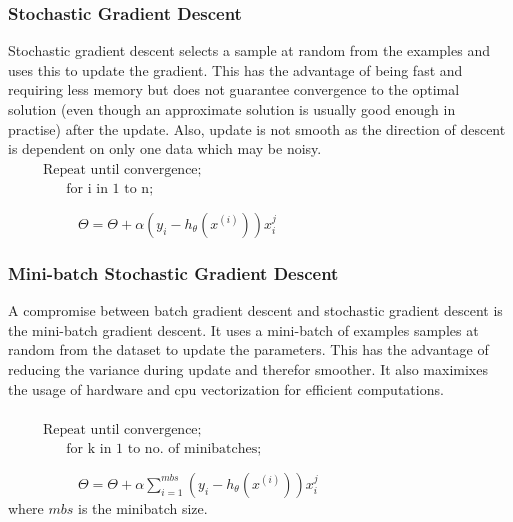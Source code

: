 \documentclass[12pt,a4paper,titlepage,portrait,openany]{book}
\begin{document}
	\subsubsection{Stochastic Gradient Descent}
	Stochastic gradient descent selects a sample at random from the examples and uses this to update the gradient. This has the advantage of being fast and requiring less memory but does not guarantee convergence to the optimal solution (even though an approximate solution is usually good enough in practise) after the update. Also, update is not smooth as the direction of descent is dependent on only one data which may be noisy. \\
	${}\hspace{30pt} \text{Repeat until convergence;} $\\
	${}\hspace{50pt} \text{for i in 1 to n;} $
	
	${}\hspace{60pt} \Theta = \Theta + \alpha\left(y_i - h_\theta(x^{(i)})\right)x_i^j $
	
	\subsubsection{Mini-batch Stochastic Gradient Descent}
	A compromise between batch gradient descent and stochastic gradient descent is the mini-batch gradient descent. It uses a mini-batch of examples samples at random from the dataset  to update the parameters. This has the advantage of reducing the variance during update and therefor smoother. It also maximixes the usage of hardware and cpu vectorization for efficient computations. \\ \\
	${}\hspace{30pt} \text{Repeat until convergence;} $\\
	${}\hspace{50pt} \text{for k in 1 to no. of minibatches;} $
	 
	${}\hspace{60pt}\Theta = \Theta + \alpha\sum_{i=1}^{mbs}\left(y_i - h_\theta(x^{(i)})\right)x_i^j $\\
	where $mbs$ is the minibatch size.
	 	
\end{document}

